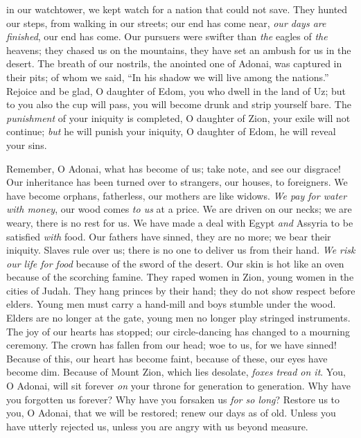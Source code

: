 \begin{biblechapter}
in our watchtower, we kept watch 
for a nation that could not save.
\verse They hunted our steps, 
from walking in our streets; 
our end has come near, \textit{our days are finished}, 
our end has come.
\verse Our pursuers were swifter 
than \textit{the} eagles of \textit{the} heavens; 
they chased us on the mountains, 
they have set an ambush for us in the desert.
\verse The breath of our nostrils, the anointed one of Adonai, 
was captured in their pits; 
of whom we said, “In his shadow 
we will live among the nations.”
\verse Rejoice and be glad, O daughter of Edom, 
you who dwell in the land of Uz; 
but to you also the cup will pass, 
you will become drunk and strip yourself bare.
\verse The \textit{punishment} of your iniquity is completed, O daughter of Zion, 
your exile will not continue; 
\textit{but} he will punish your iniquity, O daughter of Edom, 
he will reveal your sins.
\end{biblechapter}

\begin{biblechapter} %
 Remember, O Adonai, what has become of us; 
take note, and see our disgrace!
\verse Our inheritance has been turned over to strangers, 
our houses, to foreigners.
\verse We have become orphans, fatherless, 
our mothers are like widows.
\verse \textit{We pay for water with money}, 
our wood comes \textit{to us} at a price.
\verse We are driven on our necks; 
we are weary, there is no rest for us.
\verse We have made a deal with Egypt \textit{and} Assyria 
to be satisfied \textit{with} food.
\verse Our fathers have sinned, they are no more; 
we bear their iniquity.
\verse Slaves rule over us; 
there is no one to deliver us from their hand.
\verse \textit{We risk our life for food} 
because of the sword of the desert.
\verse Our skin is hot like an oven 
because of the scorching famine.
\verse They raped women in Zion, 
young women in the cities of Judah.
\verse They hang princes by their hand; 
they do not show respect before elders.
\verse Young men must carry a hand-mill 
and boys stumble under the wood.
\verse Elders are no longer at the gate, 
young men no longer play stringed instruments.
\verse The joy of our hearts has stopped; 
our circle-dancing has changed to a mourning ceremony.
\verse The crown has fallen from our head; 
woe to us, for we have sinned!
\verse Because of this, our heart has become faint, 
because of these, our eyes have become dim.
\verse Because of Mount Zion, which lies desolate, 
\textit{foxes tread on it}.
\verse You, O Adonai, will sit forever 
\textit{on} your throne for generation to generation.
\verse Why have you forgotten us forever? 
Why have you forsaken us \textit{for so long}?
\verse Restore us to you, O Adonai, that we will be restored; 
renew our days as of old.
\verse Unless you have utterly rejected us, 
unless you are angry with us beyond measure.
\end{biblechapter}

